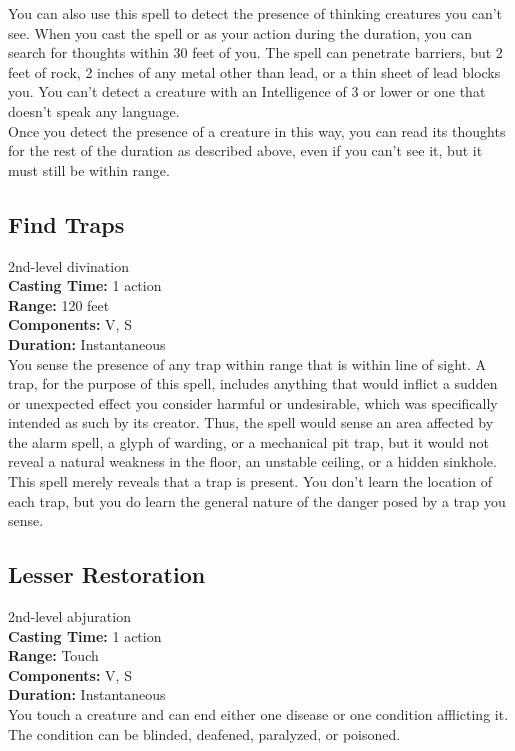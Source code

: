 \documentclass[11pt, A4paper, english]{article}
\begin{document}
You can also use this spell to detect the presence of thinking creatures you can’t see. When you cast the spell or as your action during the duration, you can search for thoughts within 30 feet of you. The spell can penetrate barriers, but 2 feet of rock, 2 inches of any metal other than lead, or a thin sheet of lead blocks you. You can’t detect a creature with an Intelligence of 3 or lower or one that doesn’t speak any language. \\
Once you detect the presence of a creature in this way, you can read its thoughts for the rest of the duration as described above, even if you can’t see it, but it must still be within range.

		\subsection{Find Traps}
2nd-level divination \\
\textbf{Casting Time:} 1 action \\
\textbf{Range:} 120 feet \\
\textbf{Components:} V, S \\
\textbf{Duration:} Instantaneous \\
You sense the presence of any trap within range that is within line of sight. A trap, for the purpose of this spell, includes anything that would inflict a sudden or unexpected effect you consider harmful or undesirable, which was specifically intended as such by its creator. Thus, the spell would sense an area affected by the alarm spell, a glyph of warding, or a mechanical pit trap, but it would not reveal a natural weakness in the floor, an unstable ceiling, or a hidden sinkhole. \\
This spell merely reveals that a trap is present. You don’t learn the location of each trap, but you do learn the general nature of the danger posed by a trap you sense.

		\subsection{Lesser Restoration}
2nd-level abjuration \\
\textbf{Casting Time:} 1 action \\
\textbf{Range:} Touch \\
\textbf{Components:} V, S \\
\textbf{Duration:} Instantaneous \\
You touch a creature and can end either one disease or one condition afflicting it. The condition can be blinded, deafened, paralyzed, or poisoned.
\end{document}
